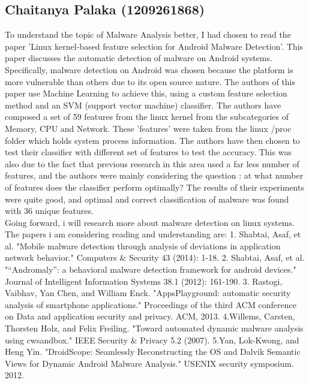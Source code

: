 \documentclass[16pt]{article}
\begin{document}
		\subsection{Chaitanya Palaka (1209261868)}
		To understand the topic of Malware Analysis better, I had chosen to read the paper 'Linux kernel-based feature selection for Android Malware Detection'. This paper discusses the automatic detection of malware on Android systems. Specifically, malware detection on Android was chosen because the platform is more vulnerable than others due to its open source nature. The authors of this paper use Machine Learning to achieve this, using a custom feature selection method and an SVM (support vector machine) classifier. The authors have composed a set of 59 features from the linux kernel from the subcategories of Memory, CPU and Network. These 'features' were taken from the linux /proc folder which holds system process information. The authors have then chosen to test their classifier with different set of features to test the accuracy. This was also due to the fact that previous research in this area used a far less number of features, and the authors were mainly considering the question : at what number of features does the classifier perform optimally? The results of their experiments were quite good, and optimal and correct classification of malware was found with 36 unique features.\\
		
		Going forward, i will research more about malware detection on linux systems. The papers i am considering reading and understanding are:
		1. Shabtai, Asaf, et al. "Mobile malware detection through analysis of deviations in application network behavior." Computers \& Security 43 (2014): 1-18.
		2. Shabtai, Asaf, et al. "“Andromaly”: a behavioral malware detection framework for android devices." Journal of Intelligent Information Systems 38.1 (2012): 161-190.
		3. Rastogi, Vaibhav, Yan Chen, and William Enck. "AppsPlayground: automatic security analysis of smartphone applications." Proceedings of the third ACM conference on Data and application security and privacy. ACM, 2013.
		4.Willems, Carsten, Thorsten Holz, and Felix Freiling. "Toward automated dynamic malware analysis using cwsandbox." IEEE Security \& Privacy 5.2 (2007).
		5.Yan, Lok-Kwong, and Heng Yin. "DroidScope: Seamlessly Reconstructing the OS and Dalvik Semantic Views for Dynamic Android Malware Analysis." USENIX security symposium. 2012.
		
\end{document}
